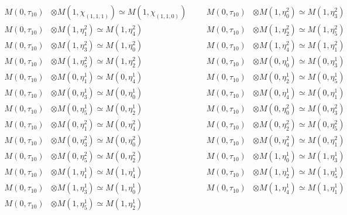 \begin{align*}
M(0,\tau_{10}) &\otimes M(1,\chi_{(1,1,1)}) \simeq M(1,\chi_{(1,1,0)}) &&& M(0,\tau_{10}) &\otimes M(1,\eta^{2}_{0}) \simeq M(1,\eta^{2}_{3})\\
M(0,\tau_{10}) &\otimes M(1,\eta^{2}_{1}) \simeq M(1,\eta^{2}_{4}) &&& M(0,\tau_{10}) &\otimes M(1,\eta^{2}_{2}) \simeq M(1,\eta^{2}_{5})\\
M(0,\tau_{10}) &\otimes M(1,\eta^{2}_{3}) \simeq M(1,\eta^{2}_{0}) &&& M(0,\tau_{10}) &\otimes M(1,\eta^{2}_{4}) \simeq M(1,\eta^{2}_{1})\\
M(0,\tau_{10}) &\otimes M(1,\eta^{2}_{5}) \simeq M(1,\eta^{2}_{2}) &&& M(0,\tau_{10}) &\otimes M(0,\eta^{1}_{0}) \simeq M(0,\eta^{1}_{3})\\
M(0,\tau_{10}) &\otimes M(0,\eta^{1}_{1}) \simeq M(0,\eta^{1}_{4}) &&& M(0,\tau_{10}) &\otimes M(0,\eta^{1}_{2}) \simeq M(0,\eta^{1}_{5})\\
M(0,\tau_{10}) &\otimes M(0,\eta^{1}_{3}) \simeq M(0,\eta^{1}_{0}) &&& M(0,\tau_{10}) &\otimes M(0,\eta^{1}_{4}) \simeq M(0,\eta^{1}_{1})\\
M(0,\tau_{10}) &\otimes M(0,\eta^{1}_{5}) \simeq M(0,\eta^{1}_{2}) &&& M(0,\tau_{10}) &\otimes M(0,\eta^{2}_{0}) \simeq M(0,\eta^{2}_{3})\\
M(0,\tau_{10}) &\otimes M(0,\eta^{2}_{1}) \simeq M(0,\eta^{2}_{4}) &&& M(0,\tau_{10}) &\otimes M(0,\eta^{2}_{2}) \simeq M(0,\eta^{2}_{5})\\
M(0,\tau_{10}) &\otimes M(0,\eta^{2}_{3}) \simeq M(0,\eta^{2}_{0}) &&& M(0,\tau_{10}) &\otimes M(0,\eta^{2}_{4}) \simeq M(0,\eta^{2}_{1})\\
M(0,\tau_{10}) &\otimes M(0,\eta^{2}_{5}) \simeq M(0,\eta^{2}_{2}) &&& M(0,\tau_{10}) &\otimes M(1,\eta^{1}_{0}) \simeq M(1,\eta^{1}_{3})\\
M(0,\tau_{10}) &\otimes M(1,\eta^{1}_{1}) \simeq M(1,\eta^{1}_{4}) &&& M(0,\tau_{10}) &\otimes M(1,\eta^{1}_{2}) \simeq M(1,\eta^{1}_{5})\\
M(0,\tau_{10}) &\otimes M(1,\eta^{1}_{3}) \simeq M(1,\eta^{1}_{0}) &&& M(0,\tau_{10}) &\otimes M(1,\eta^{1}_{4}) \simeq M(1,\eta^{1}_{1})\\
M(0,\tau_{10}) &\otimes M(1,\eta^{1}_{5}) \simeq M(1,\eta^{1}_{2})
\end{align*}

